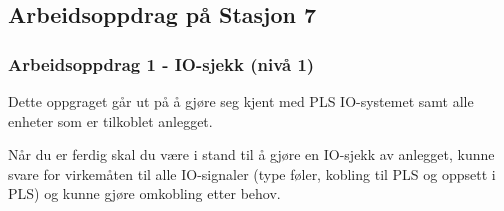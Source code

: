 \subsection*{Arbeidsoppdrag på Stasjon 7}

\subsubsection*{Arbeidsoppdrag 1 - IO-sjekk (nivå 1)}

Dette oppgraget går ut på å gjøre seg kjent med PLS IO-systemet samt
alle enheter som er tilkoblet anlegget. 

Når du er ferdig skal du være i stand til å gjøre en IO-sjekk av anlegget, kunne svare for virkemåten til alle IO-signaler (type føler, kobling til PLS og oppsett i PLS) og kunne gjøre omkobling etter behov.

